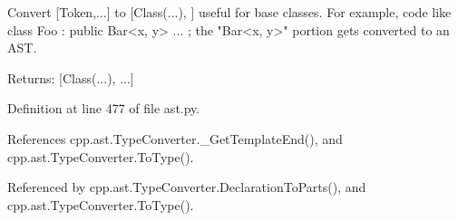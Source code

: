 \begin{DoxyVerb}Convert [Token,...] to [Class(...), ] useful for base classes.
For example, code like class Foo : public Bar<x, y> { ... };
the "Bar<x, y>" portion gets converted to an AST.

Returns:
  [Class(...), ...]
\end{DoxyVerb}
 

Definition at line 477 of file ast.\+py.



References cpp.\+ast.\+Type\+Converter.\+\_\+\+Get\+Template\+End(), and cpp.\+ast.\+Type\+Converter.\+To\+Type().



Referenced by cpp.\+ast.\+Type\+Converter.\+Declaration\+To\+Parts(), and cpp.\+ast.\+Type\+Converter.\+To\+Type().


